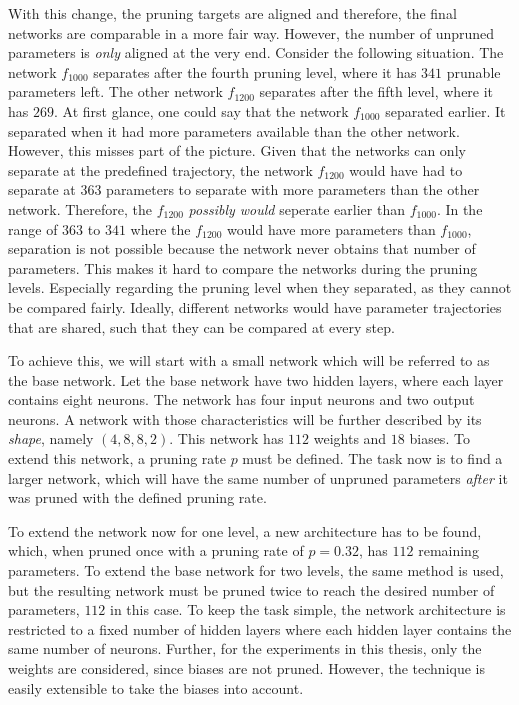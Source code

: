 With this change, the pruning targets are aligned and therefore, the final networks are comparable in a more fair way.
However, the number of unpruned parameters is \textit{only} aligned at the very end.
Consider the following situation.
The network $f_{1000}$ separates after the fourth pruning level, where it has $341$ prunable parameters left. 
The other network $f_{1200}$ separates after the fifth level, where it has $269$.
At first glance, one could say that the network $f_{1000}$ separated earlier.
It separated when it had more parameters available than the other network.
However, this misses part of the picture.
Given that the networks can only separate at the predefined trajectory, the network $f_{1200}$ would have had to separate at $363$ parameters to separate with more parameters than the other network.
Therefore, the $f_{1200}$ \textit{possibly would} seperate earlier than $f_{1000}$.
In the range of $363$ to $341$ where the $f_{1200}$ would have more parameters than $f_{1000}$, separation is not possible because the network never obtains that number of parameters.
This makes it hard to compare the networks during the pruning levels.
Especially regarding the pruning level when they separated, as they cannot be compared fairly.
Ideally, different networks would have parameter trajectories that are shared, such that they can be compared at every step.

To achieve this, we will start with a small network which will be referred to as the base network.
Let the base network have two hidden layers, where each layer contains eight neurons.
The network has four input neurons and two output neurons.
A network with those characteristics will be further described by its \textit{shape}, namely $(4, 8, 8, 2)$.
This network has $112$ weights and $18$ biases.
To extend this network, a pruning rate $p$ must be defined.
The task now is to find a larger network, which will have the same number of unpruned parameters \textit{after} it was pruned with the defined pruning rate.

To extend the network now for one level, a new architecture has to be found, which, when pruned once with a pruning rate of $p=0.32$, has $112$ remaining parameters.
To extend the base network for two levels, the same method is used, but the resulting network must be pruned twice to reach the desired number of parameters, $112$ in this case.
To keep the task simple, the network architecture is restricted to a fixed number of hidden layers where each hidden layer contains the same number of neurons.
Further, for the experiments in this thesis, only the weights are considered, since biases are not pruned.
However, the technique is easily extensible to take the biases into account.

